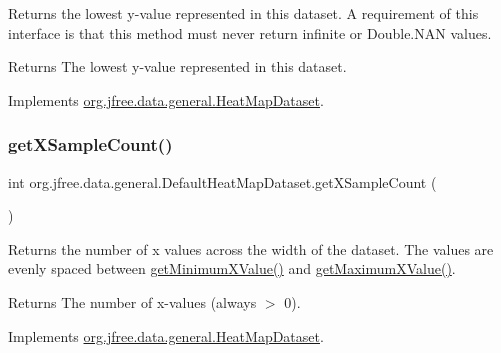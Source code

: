 Returns the lowest y-\/value represented in this dataset. A requirement of this interface is that this method must never return infinite or Double.\+N\+AN values.

\begin{DoxyReturn}{Returns}
The lowest y-\/value represented in this dataset. 
\end{DoxyReturn}


Implements \mbox{\hyperlink{interfaceorg_1_1jfree_1_1data_1_1general_1_1_heat_map_dataset_ad3b85b7cbe6b7bb308701f5a58613903}{org.\+jfree.\+data.\+general.\+Heat\+Map\+Dataset}}.

\mbox{\label{classorg_1_1jfree_1_1data_1_1general_1_1_default_heat_map_dataset_a0dd847578301662deb9a9880a603e7f1}} 
\subsubsection{\texorpdfstring{get\+X\+Sample\+Count()}{getXSampleCount()}}
{\footnotesize\ttfamily int org.\+jfree.\+data.\+general.\+Default\+Heat\+Map\+Dataset.\+get\+X\+Sample\+Count (\begin{DoxyParamCaption}{ }\end{DoxyParamCaption})}

Returns the number of x values across the width of the dataset. The values are evenly spaced between \mbox{\hyperlink{classorg_1_1jfree_1_1data_1_1general_1_1_default_heat_map_dataset_ab15741ca0fcbd1d8224d228aef4a80b2}{get\+Minimum\+X\+Value()}} and \mbox{\hyperlink{classorg_1_1jfree_1_1data_1_1general_1_1_default_heat_map_dataset_aa3c976aabd54b923d2f01cea7b3a0657}{get\+Maximum\+X\+Value()}}.

\begin{DoxyReturn}{Returns}
The number of x-\/values (always $>$ 0). 
\end{DoxyReturn}


Implements \mbox{\hyperlink{interfaceorg_1_1jfree_1_1data_1_1general_1_1_heat_map_dataset_ada47a69a69c446d7f519d6bf05a47f6f}{org.\+jfree.\+data.\+general.\+Heat\+Map\+Dataset}}.

